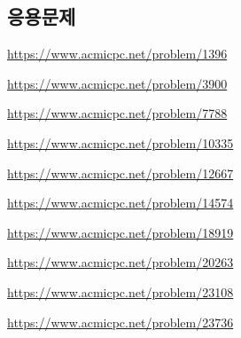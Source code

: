\subsection{응용문제}
\begin{problem} \url{https://www.acmicpc.net/problem/1396} \end{problem}
\begin{problem} \url{https://www.acmicpc.net/problem/3900} \end{problem}
\begin{problem} \url{https://www.acmicpc.net/problem/7788} \end{problem}
\begin{problem} \url{https://www.acmicpc.net/problem/10335} \end{problem}
\begin{problem} \url{https://www.acmicpc.net/problem/12667} \end{problem}
\begin{problem} \url{https://www.acmicpc.net/problem/14574} \end{problem}
\begin{problem} \url{https://www.acmicpc.net/problem/18919} \end{problem}
\begin{problem} \url{https://www.acmicpc.net/problem/20263} \end{problem}
\begin{problem} \url{https://www.acmicpc.net/problem/23108} \end{problem}
\begin{problem} \url{https://www.acmicpc.net/problem/23736} \end{problem}

